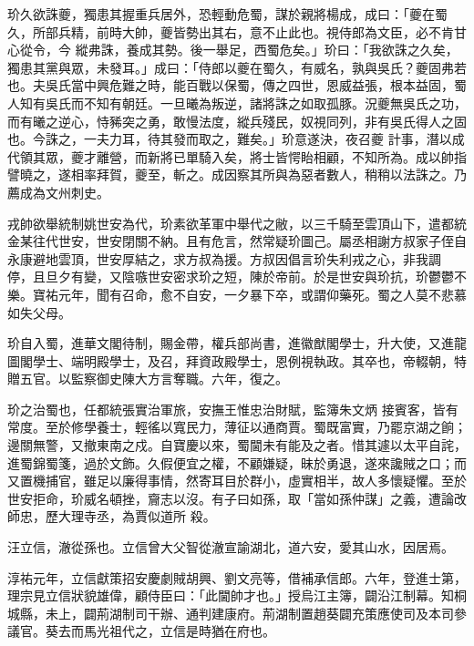\begin{pinyinscope}
 玠久欲誅夔，獨患其握重兵居外，恐輕動危蜀，謀於親將楊成，成曰：「夔在蜀久，所部兵精，前時大帥，夔皆勢出其右，意不止此也。視侍郎為文臣，必不肯甘心從令，今
 縱弗誅，養成其勢。後一舉足，西蜀危矣。」玠曰：「我欲誅之久矣，獨患其黨與眾，未發耳。」成曰：「侍郎以夔在蜀久，有威名，孰與吳氏？夔固弗若也。夫吳氏當中興危難之時，能百戰以保蜀，傳之四世，恩威益張，根本益固，蜀人知有吳氏而不知有朝廷。一旦曦為叛逆，諸將誅之如取孤豚。況夔無吳氏之功，而有曦之逆心，恃豨突之勇，敢慢法度，縱兵殘民，奴視同列，非有吳氏得人之固也。今誅之，一夫力耳，待其發而取之，難矣。」玠意遂決，夜召夔
 計事，潛以成代領其眾，夔才離營，而新將已單騎入矣，將士皆愕眙相顧，不知所為。成以帥指譬曉之，遂相率拜賀，夔至，斬之。成因察其所與為惡者數人，稍稍以法誅之。乃薦成為文州刺史。



 戎帥欲舉統制姚世安為代，玠素欲革軍中舉代之敝，以三千騎至雲頂山下，遣都統金某往代世安，世安閉關不納。且有危言，然常疑玠圖己。屬丞相謝方叔家子侄自永康避地雲頂，世安厚結之，求方叔為援。方叔因倡言玠失利戎之心，非我調
 停，且旦夕有變，又陰嗾世安密求玠之短，陳於帝前。於是世安與玠抗，玠鬱鬱不樂。寶祐元年，聞有召命，愈不自安，一夕暴下卒，或謂仰藥死。蜀之人莫不悲慕如失父母。



 玠自入蜀，進華文閣待制，賜金帶，權兵部尚書，進徽猷閣學士，升大使，又進龍圖閣學士、端明殿學士，及召，拜資政殿學士，恩例視執政。其卒也，帝輟朝，特贈五官。以監察御史陳大方言奪職。六年，復之。



 玠之治蜀也，任都統張實治軍旅，安撫王惟忠治財賦，監簿朱文炳
 接賓客，皆有常度。至於修學養士，輕徭以寬民力，薄征以通商賈。蜀既富實，乃罷京湖之餉；邊關無警，又撤東南之戍。自寶慶以來，蜀閫未有能及之者。惜其遽以太平自詫，進蜀錦蜀箋，過於文飾。久假便宜之權，不顧嫌疑，昧於勇退，遂來讒賊之口；而又置機捕官，雖足以廉得事情，然寄耳目於群小，虛實相半，故人多懷疑懼。至於世安拒命，玠威名頓挫，齎志以沒。有子曰如孫，取「當如孫仲謀」之義，遭論改師忠，歷大理寺丞，為賈似道所
 殺。



 汪立信，澈從孫也。立信曾大父智從澈宣諭湖北，道六安，愛其山水，因居焉。



 淳祐元年，立信獻策招安慶劇賊胡興、劉文亮等，借補承信郎。六年，登進士第，理宗見立信狀貌雄偉，顧侍臣曰：「此閫帥才也。」授烏江主簿，闢沿江制幕。知桐城縣，未上，闢荊湖制司干辦、通判建康府。荊湖制置趙葵闢充策應使司及本司參議官。葵去而馬光祖代之，立信是時猶在府也。




\end{pinyinscope}
